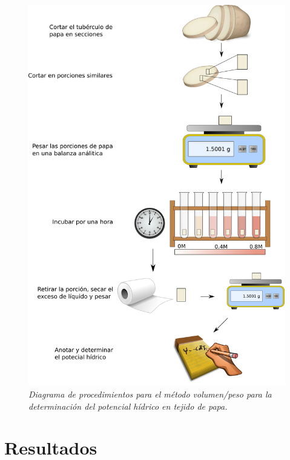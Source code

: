 \begin{figure}[h]
	
	\begin{leftbar}
	
	\includegraphics[width=\textwidth]{diagrama.png}
	\centering
	\caption{\textit{Diagrama de procedimientos para el m\'etodo volumen/peso para la determinaci\'on del potencial h\'idrico en tejido de papa.}}
	\label{fig:Diagrama_1}
	
	\end{leftbar}
	
\end{figure}

\section{Resultados}

